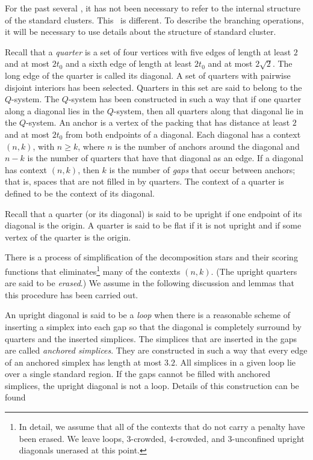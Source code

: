 For the past several \chaps, it has not been necessary to refer to
the internal structure of the standard clusters. This \chap\ is
different. To describe the branching operations, it will be
necessary to use details about the structure of standard cluster.

Recall that a {\it quarter} is a set of four vertices with five
edges of length at least $2$ and at most $2t_0$ and a sixth edge
of length at least $2t_0$ and at most $2\sqrt2$. The long edge of
the quarter is called its diagonal.   A set of quarters with
pairwise disjoint interiors has been selected. Quarters in this
set are said to belong to the $Q$-system. The $Q$-system has been
constructed in such a way that if one quarter along a diagonal
lies in the $Q$-system, then all quarters along that diagonal lie
in the $Q$-system.
An anchor is a vertex of the packing that has distance at least
$2$ and at most $2t_0$ from both endpoints of a diagonal.   Each
diagonal has a context $(n,k)$, with $n\ge k$, where $n$ is the
number of anchors around the diagonal and $n-k$ is the number of
quarters that have that diagonal as an edge. If a diagonal has
context $(n,k)$, then $k$ is the number of {\it gaps} that occur
between anchors; that is, spaces that are not filled in by
quarters. The context of a quarter is defined to be the context of
its diagonal.

Recall that a quarter (or its diagonal) is said to be upright if
one endpoint of its diagonal is the origin.  A quarter is said to
be flat if it is not upright and if some vertex of the quarter is
the origin.

There is a process of simplification of the decomposition stars
and their scoring functions that eliminates\footnote{In detail, we
assume that all of the contexts that do not carry a penalty have
been erased.  We leave loops, $3$-crowded, $4$-crowded, and
$3$-unconfined upright diagonals unerased at this point.} many of
the contexts $(n,k)$. (The upright quarters are said to be {\it
erased}.)  We assume in the following discussion and lemmas that
this procedure has been carried out.


An upright diagonal is said to be a  {\it loop} when there is a
reasonable scheme of inserting a simplex into each gap so that the
diagonal is completely surround by quarters and the inserted
simplices.  The simplices that are inserted in the gaps are called
{\it anchored simplices}.  They are constructed in such a way that
every edge of an anchored simplex has length at most $3.2$.  All
simplices in a given loop lie over a single standard region.   If
the gaps cannot be filled with anchored simplices, the upright
diagonal is not a loop. Details of this construction can be found
 


